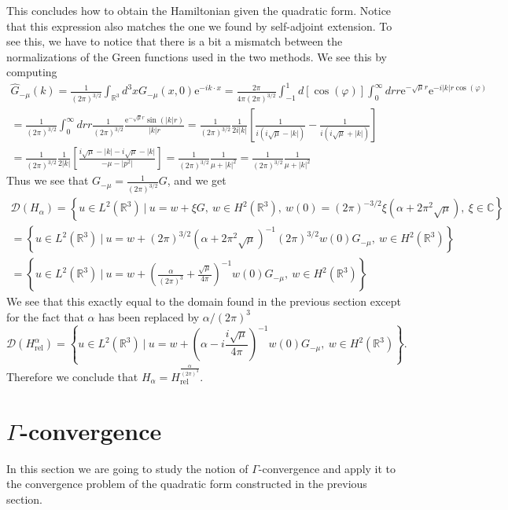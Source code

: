 \documentclass[a4paper,11pt]{article}
\newcommand{\euler}[1]{\text{e}^{#1}}
\newcommand{\dom}[1]{\mathscr D\left(#1\right)}
\newcommand{\R}{\mathbb{R}}
\newcommand{\C}{\mathbb{C}}
\numberwithin{equation}{section}
\begin{document}
This concludes how to obtain the Hamiltonian given the quadratic form. Notice that this expression also matches the one we found by self-adjoint extension. To see this, we have to notice that there is a bit a mismatch between the normalizations of the Green functions used in the two methods. We see this by computing \begin{equation}
\begin{aligned}
\hat{G}_{-\mu}(k)=\frac{1}{(2\pi)^{3/2}}\int_{\R^3} d^3x G_{-\mu}(x,0)\euler{-ik\cdot x}=\frac{2\pi}{4\pi(2\pi)^{3/2}}\int_{-1}^{1} d[\cos(\varphi)]\int_{0}^{\infty}dr r \euler{-\sqrt{\mu}r}\euler{-i|k|r\cos(\varphi)}\\
=\frac{1}{(2\pi)^{3/2}}\int_{0}^{\infty}dr r\frac{1}{(2\pi)^{3/2}} \frac{\euler{-\sqrt{\mu}r}\sin(|k|r)}{|k|r}
=\frac{1}{(2\pi)^{3/2}}\frac{1}{2i|k|}\left[\frac{1}{i(i\sqrt{\mu}-|k|)}-\frac{1}{i(i\sqrt{\mu}+|k|)}\right]\\
=\frac{1}{(2\pi)^{3/2}}\frac{1}{2|k|}\left[\frac{i\sqrt{\mu}-|k|-i\sqrt{\mu}-|k|}{-\mu-|p^2|}\right]=\frac{1}{(2\pi)^{3/2}}\frac{1}{\mu+|k|^2}=\frac{1}{(2\pi)^{3/2}}\frac{1}{\mu+|k|^2}
\end{aligned}
\end{equation}
Thus we see that $ G_{-\mu}=\frac{1}{(2\pi)^{3/2}}G $, and we get
\begin{equation}
\begin{aligned}
\dom{H_\alpha}=\left\{ u\in L^2(\R^3)\ |\ u=w+\xi G,\ w\in H^2(\R^3),\ w(0)=(2\pi)^{-3/2}\xi(\alpha+2\pi^2\sqrt{\mu}),\ \xi\in\C \right\}\\
=\left\{ u\in L^2(\R^3)\ |\ u=w+(2\pi)^{3/2}(\alpha+2\pi^2\sqrt{\mu})^{-1}(2\pi)^{3/2}w(0) G_{-\mu},\ w\in H^2(\R^3)\right\}\\
=\left\{ u\in L^2(\R^3)\ |\ u=w+\left(\frac{\alpha}{(2\pi)^3}+\frac{\sqrt{\mu}}{4\pi}\right)^{-1}w(0) G_{-\mu},\ w\in H^2(\R^3)\right\}
\end{aligned}
\end{equation}
We see that this exactly equal to the domain found in the previous section except for the fact that $ \alpha $ has been replaced by $ \alpha/(2\pi)^{3} $\begin{equation}
\dom{H_{\text{rel}}^\alpha}=\left\{ u\in L^2(\R^3)\ |\ u=w+\left(\alpha-i\frac{i\sqrt{\mu}}{4\pi}\right)^{-1}w(0) G_{-\mu},\ w\in H^2(\R^3)\right\}.
\end{equation}
Therefore we conclude that $ H_\alpha=H_{\text{rel}}^{\frac{\alpha}{(2\pi)^3}} $.
\section{$ \Gamma $-convergence}
In this section we are going to study the notion of $ \Gamma $-convergence and apply it to the convergence problem of the quadratic form constructed in the previous section. 
\end{document}
